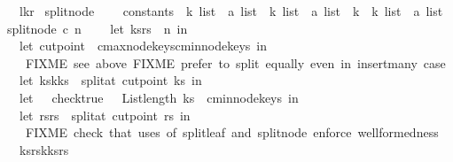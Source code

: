 \begin{isabellebody}
\ \ {\isacharparenleft}l{\isacharcomma}k{\isacharcomma}r{\isacharparenright}\isanewline
{\isacharparenright}{\isachardoublequoteclose}\isanewline
\isanewline
\isanewline
\isanewline
{}\isamarkupfalse%
\ split{\isacharunderscore}node\ {\isacharcolon}{\isacharcolon}\ \isanewline
\ \ {\isachardoublequoteopen}constants\ {\isasymRightarrow}\ {\isacharparenleft}{\isacharprime}k\ list\ {\isacharasterisk}\ {\isacharprime}a\ list{\isacharparenright}\ {\isasymRightarrow}\ {\isacharparenleft}{\isacharprime}k\ list\ {\isacharasterisk}\ {\isacharprime}a\ list{\isacharparenright}\ {\isacharasterisk}\ {\isacharprime}k\ {\isacharasterisk}\ {\isacharparenleft}{\isacharprime}k\ list\ {\isacharasterisk}\ {\isacharprime}a\ list{\isacharparenright}{\isachardoublequoteclose}\ \isanewline
{}\isanewline
{\isachardoublequoteopen}split{\isacharunderscore}node\ c\ n\ {\isacharequal}\ {\isacharparenleft}\isanewline
\ \ let\ {\isacharparenleft}ks{\isacharcomma}rs{\isacharparenright}\ {\isacharequal}\ n\ in\isanewline
\isanewline
\ \ let\ cut{\isacharunderscore}point\ {\isacharequal}\ {\isacharparenleft}c{\isacharbar}{\isachargreater}max{\isacharunderscore}node{\isacharunderscore}keys{\isacharminus}c{\isacharbar}{\isachargreater}min{\isacharunderscore}node{\isacharunderscore}keys{\isacharparenright}\ in\ \ \isanewline
\ \ {\isacharparenleft}{\isacharasterisk}\ FIXME\ see\ above{\isacharsemicolon}\ FIXME\ prefer\ to\ split\ equally\ even\ in\ insert{\isacharunderscore}many\ case{\isacharquery}\ {\isacharasterisk}{\isacharparenright}\isanewline
\isanewline
\ \ let\ {\isacharparenleft}ks{}{\isacharcomma}k{\isacharcomma}ks{}{\isacharparenright}\ {\isacharequal}\ split{\isacharunderscore}at{\isacharunderscore}{}\ cut{\isacharunderscore}point\ ks\ in\isanewline
\ \ let\ {\isacharunderscore}\ {\isacharequal}\ check{\isacharunderscore}true\ {\isacharparenleft}{\isacharpercent}\ {\isacharunderscore}{\isachardot}\ List{\isachardot}length\ ks{}\ {\isasymge}\ c{\isacharbar}{\isachargreater}min{\isacharunderscore}node{\isacharunderscore}keys{\isacharparenright}\ in\isanewline
\ \ let\ {\isacharparenleft}rs{}{\isacharcomma}rs{}{\isacharparenright}\ {\isacharequal}\ split{\isacharunderscore}at\ {\isacharparenleft}cut{\isacharunderscore}point{\isacharplus}{}{\isacharparenright}\ rs\ in\isanewline
\ \ {\isacharparenleft}{\isacharasterisk}\ FIXME\ check\ that\ uses\ of\ split{\isacharunderscore}leaf\ and\ split{\isacharunderscore}node\ enforce\ wellformedness\ {\isacharasterisk}{\isacharparenright}\isanewline
\ \ {\isacharparenleft}{\isacharparenleft}ks{}{\isacharcomma}rs{}{\isacharparenright}{\isacharcomma}k{\isacharcomma}{\isacharparenleft}ks{}{\isacharcomma}rs{}{\isacharparenright}{\isacharparenright}\isanewline
{\isacharparenright}{\isachardoublequoteclose}\isanewline
\isanewline
\isanewline
%
\isadelimtheory
\isanewline
%
\endisadelimtheory
%
\isatagtheory
{}\isamarkupfalse%
%
\endisatagtheory
{\isafoldtheory}%
%
\isadelimtheory
%
\endisadelimtheory
\end{isabellebody}%
